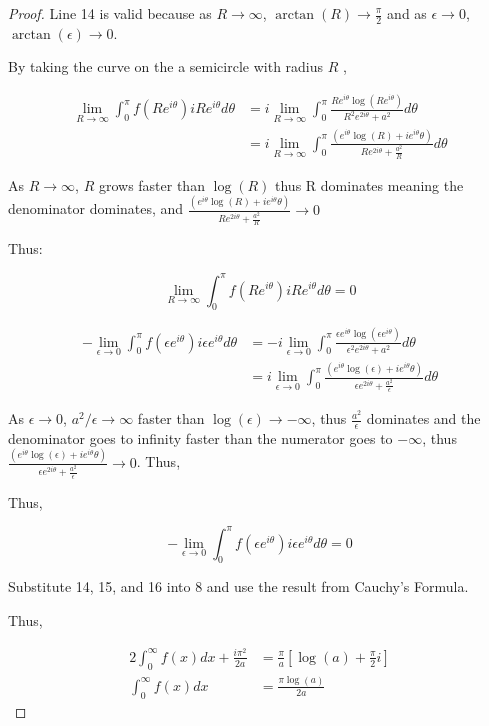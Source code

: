 \documentclass{article}
\newcommand*{\lm}[1]{\lim_{#1 \to \infty}}
\begin{document}
\begin{proof}
    Line 14 is valid because as $R \to \infty$, $\arctan(R) \to \frac{\pi}{2}$ and as $\epsilon \to 0$, $\arctan(\epsilon) \to 0$.       


    By taking the curve on the a semicircle with radius $R$ , 

    \begin{align*}
        \lm{R} \int_{0}^{\pi} f(Re^{i \theta}) iRe^{i \theta} d \theta &= i \lm{R}\int_{0}^{\pi} \frac{R e^{i \theta}\log(Re^{i \theta})}{R^2 e^{2i \theta} + a^2} d \theta \\
        &= i \lm{R} \int_{0}^{\pi} \frac{(e^{i \theta}\log(R) + ie^{i \theta}\theta)}{R e^{2 i \theta} + \frac{a^2}{R}} d \theta
    \end{align*}


    As $R \to \infty$, $R$ grows faster than $\log(R)$ thus R dominates meaning the denominator dominates, and $\frac{(e^{i \theta}\log(R) + ie^{i \theta}\theta)}{R e^{2 i \theta} + \frac{a^2}{R}} \to 0$  
    
    Thus:

    \begin{equation}
        \lm{R} \int_{0}^{\pi} f(Re^{i \theta}) iRe^{i \theta} d \theta = 0
    \end{equation}

    \begin{align*}
        - \lim_{\epsilon \to 0} \int_{0}^{\pi} f(\epsilon e^{i \theta}) i \epsilon e^{i \theta} d \theta &= - i \lim_{\epsilon \to 0} \int_{0}^{\pi} \frac{\epsilon e^{i \theta}\log( \epsilon e^{i \theta})}{\epsilon^2 e^{2i \theta} + a^2} d \theta \\
        &= i \lim_{\epsilon \to 0} \int_{0}^{\pi} \frac{(e^{i \theta}\log(\epsilon) + i e^{i \theta}\theta)}{\epsilon e^{2 i \theta} + \frac{a^2}{\epsilon}} d \theta
    \end{align*}

    As $\epsilon \to 0$, $a^2 / \epsilon \to \infty$ faster than $\log(\epsilon) \to - \infty$, thus $\frac{a^2}{\epsilon}$ dominates and the denominator goes to infinity faster than the numerator goes to $-\infty$, thus $\frac{(e^{i \theta}\log(\epsilon) + i e^{i \theta}\theta)}{\epsilon e^{2 i \theta} + \frac{a^2}{\epsilon}} \to 0$. Thus, 
    
    
    Thus,

    \begin{equation}
        - \lim_{\epsilon \to 0}  \int_{0}^{\pi} f(\epsilon e^{i \theta}) i \epsilon e^{i \theta} d \theta = 0
    \end{equation}
    
    Substitute 14, 15, and 16 into 8 and use the result from Cauchy's Formula. 

    Thus,
    
    \begin{align*}
        2 \int_{0}^{\infty} f(x) dx + \frac{i \pi^2}{2a} &= \frac{\pi}{a}\left[\log(a) + \frac{\pi}{2}i\right] \\
        \int_{0}^{\infty} f(x) dx&= \frac{\pi \log(a)}{2a}
    \end{align*}
\end{proof}
\end{document}

